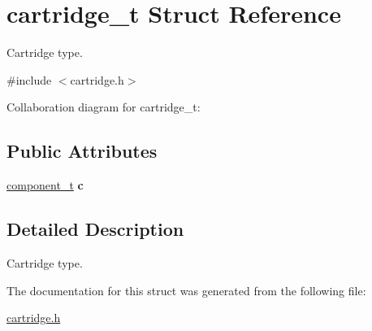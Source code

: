 \hypertarget{structcartridge__t}{}\section{cartridge\+\_\+t Struct Reference}
\label{structcartridge__t}


Cartridge type.  




{\ttfamily \#include $<$cartridge.\+h$>$}



Collaboration diagram for cartridge\+\_\+t\+:
\subsection*{Public Attributes}
\begin{DoxyCompactItemize}
\item 
\mbox{\label{structcartridge__t_a4873d2c34bb27448105baabbea1daa84}} 
\hyperlink{structcomponent__t}{component\+\_\+t} {\bfseries c}
\end{DoxyCompactItemize}


\subsection{Detailed Description}
Cartridge type. 

The documentation for this struct was generated from the following file\+:\begin{DoxyCompactItemize}
\item 
\hyperlink{cartridge_8h}{cartridge.\+h}\end{DoxyCompactItemize}

